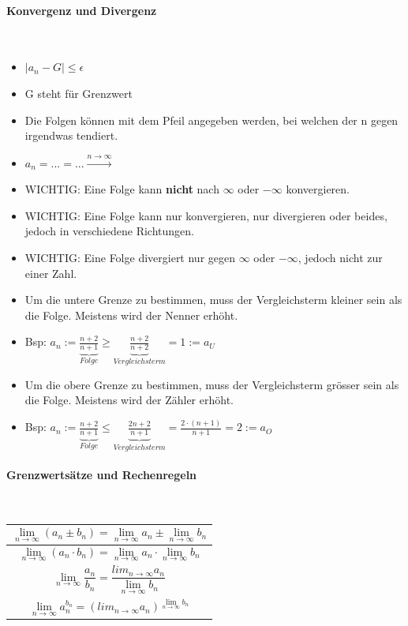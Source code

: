 \paragraph{Konvergenz und Divergenz}\mbox{}\\
\begin{itemize}
    \item $|a_{n} - G| \leq \epsilon $
    \item G steht für Grenzwert
    \item Die Folgen können mit dem Pfeil angegeben werden, bei welchen der n gegen irgendwas tendiert.
    \item $a_n = ... = ... \xrightarrow{n \rightarrow \infty}$
    \item WICHTIG: Eine Folge kann \textbf{nicht} nach $\infty$ oder $-\infty$ konvergieren.
    \item WICHTIG: Eine Folge kann nur konvergieren, nur divergieren oder beides, jedoch in verschiedene Richtungen.
    \item WICHTIG: Eine Folge divergiert nur gegen $\infty$ oder $-\infty$, jedoch nicht zur einer Zahl.
    \item Um die untere Grenze zu bestimmen, muss der Vergleichsterm kleiner sein als die Folge. Meistens wird der Nenner erhöht.
    \item Bsp: $a_n := \underbrace{\frac{n+2}{n+1}}_{Folge} \geq \underbrace{\frac{n+2}{n+2}}_{Vergleichsterm} = 1 := a_U$
    \item Um die obere Grenze zu bestimmen, muss der Vergleichsterm grösser sein als die Folge. Meistens wird der Zähler erhöht.
    \item Bsp: $a_n := \underbrace{\frac{n+2}{n+1}}_{Folge} \leq \underbrace{\frac{2n+2}{n+1}}_{Vergleichsterm} = \frac{2 \cdot (n+1)}{n+1} = 2 := a_O$
\end{itemize}
\vspace{1mm}

\paragraph{Grenzwertsätze und Rechenregeln}\mbox{}\\
\noindent
\begin{tabularx}{\columnwidth}{@{}X@{}}
    \hline
    \[ \lim_{n \to \infty} (a_n \pm b_n ) = \lim_{n \to \infty} a_n \pm \lim_{n \to \infty} b_n \] \\ \hline
    \[ \lim_{n \to \infty} (a_n \cdot b_n ) = \lim_{n \to \infty} a_n \cdot \lim_{n \to \infty} b_n \] \\ \hline
    \[ \lim_{n \to \infty}  \frac{a_n}{b_n} = \frac{lim_{n \to \infty} a_n}{\lim_{n \to \infty} b_n} \] \\ \hline
    \[ \lim_{n \to \infty} a_n^{b_n} = \left( lim_{n \to \infty} a_n\right)^{\lim_{n \to \infty} b_n} \] \\ \hline
\end{tabularx}
\vspace{1mm}

